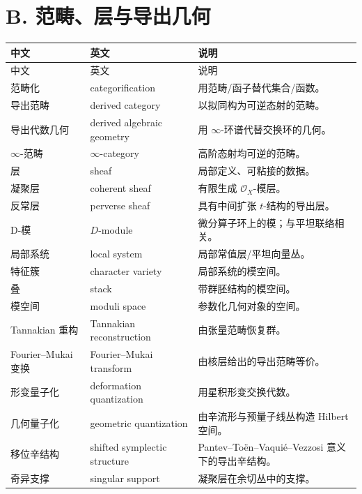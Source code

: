 \section*{B. 范畴、层与导出几何}
\begin{longtable}{p{}p{}p{}}
\toprule
中文 & 英文 & 说明\\
\midrule
\endfirsthead
\toprule
中文 & 英文 & 说明\\
\midrule
\endhead
范畴化 & categorification & 用范畴/函子替代集合/函数。\\
导出范畴 & derived category & 以拟同构为可逆态射的范畴。\\
导出代数几何 & derived algebraic geometry & 用 $\infty$-环谱代替交换环的几何。\\
$\infty$-范畴 & $\infty$-category & 高阶态射均可逆的范畴。\\
层 & sheaf & 局部定义、可粘接的数据。\\
凝聚层 & coherent sheaf & 有限生成 $\mathcal{O}_X$-模层。\\
反常层 & perverse sheaf & 具有中间扩张 $t$-结构的导出层。\\
D-模 & $D$-module & 微分算子环上的模；与平坦联络相关。\\
局部系统 & local system & 局部常值层/平坦向量丛。\\
特征簇 & character variety & 局部系统的模空间。\\
叠 & stack & 带群胚结构的模空间。\\
模空间 & moduli space & 参数化几何对象的空间。\\
Tannakian 重构 & Tannakian reconstruction & 由张量范畴恢复群。\\
Fourier--Mukai 变换 & Fourier--Mukai transform & 由核层给出的导出范畴等价。\\
形变量子化 & deformation quantization & 用星积形变交换代数。\\
几何量子化 & geometric quantization & 由辛流形与预量子线丛构造 Hilbert 空间。\\
移位辛结构 & shifted symplectic structure & Pantev--To\"en--Vaqui\'e--Vezzosi 意义下的导出辛结构。\\
奇异支撑 & singular support & 凝聚层在余切丛中的支撑。\\
\bottomrule
\end{longtable}

